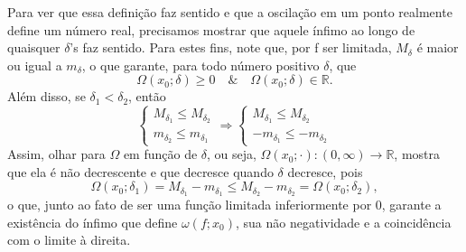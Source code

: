 \documentclass[../analysisII_notes.tex]{subfiles}
\begin{document}
Para ver que essa definição faz sentido e que a oscilação em um ponto realmente define um número real, precisamos mostrar que aquele ínfimo ao longo de quaisquer \(\delta \)'s faz sentido. Para estes fins, note que, por f ser limitada, \(M_{\delta }\) é maior ou igual a \(m_{\delta }\), o que garante, para todo número positivo \(\delta \), que
\[
	\Omega (x_{0}; \delta )\geq 0 \quad\&\quad \Omega (x_{0}; \delta )\in \mathbb{R}.
\]
Além disso, se \(\delta_{1} < \delta_{2}\), então
\[
	\left\{\begin{array}{ll}
		M_{\delta_{1}}\leq M_{\delta_2} \\
		m_{\delta_{2}}\leq m_{\delta_1}
	\end{array}\right. \Rightarrow \left\{\begin{array}{ll}
		M_{\delta_{1}}\leq M_{\delta_2} \\
		-m_{\delta_{1}}\leq - m_{\delta_2}
	\end{array}\right.
\]
Assim, olhar para \(\Omega \) em função de \(\delta \), ou seja, \(\Omega (x_{0}; \cdot ):(0, \infty)\rightarrow \mathbb{R} \), mostra que ela é não decrescente e que decresce quando \(\delta \) decresce, pois
\[
	\Omega (x_{0}; \delta_{1}) = M_{\delta_{1}} - m_{\delta_{1}} \leq M_{\delta_{2}} - m_{\delta_{2}} = \Omega(x_{0}; \delta_{2}),
\]
o que, junto ao fato de ser uma função limitada inferiormente por 0, garante a existência do ínfimo que define \(\omega(f; x_{0})\), sua não negatividade e a coincidência com o limite à direita.
\end{document}
